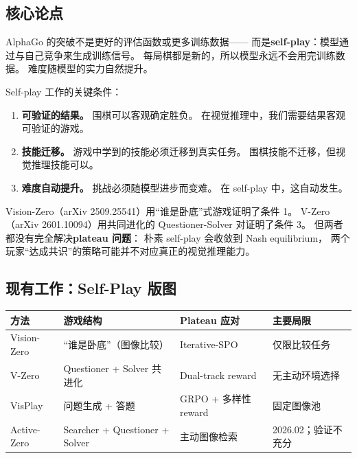 \documentclass[12pt,a4paper]{article}
\begin{document}
\subsection{核心论点}

\begin{insightbox}
AlphaGo 的突破不是更好的评估函数或更多训练数据——
而是\textbf{self-play}：模型通过与自己竞争来生成训练信号。
每局棋都是新的，所以模型永远不会用完训练数据。
难度随模型的实力自然提升。

Self-play 工作的关键条件：
\begin{enumerate}[leftmargin=2em]
  \item \textbf{可验证的结果。}
    围棋可以客观确定胜负。
    在视觉推理中，我们需要结果客观可验证的游戏。
  \item \textbf{技能迁移。}
    游戏中学到的技能必须迁移到真实任务。
    围棋技能不迁移，但视觉推理技能可以。
  \item \textbf{难度自动提升。}
    挑战必须随模型进步而变难。
    在 self-play 中，这自动发生。
\end{enumerate}

Vision-Zero（arXiv 2509.25541）用``谁是卧底''式游戏证明了条件 1。
V-Zero（arXiv 2601.10094）用共同进化的 Questioner-Solver 对证明了条件 3。
但两者都没有完全解决\textbf{plateau 问题}：
朴素 self-play 会收敛到 Nash equilibrium，
两个玩家``达成共识''的策略可能并不对应真正的视觉推理能力。
\end{insightbox}

\subsection{现有工作：Self-Play 版图}

\begin{table}[h]
\centering
\small
\begin{tabular}{p{2.5cm}p{3cm}p{2.5cm}p{3cm}}
\toprule
\textbf{方法} & \textbf{游戏结构} & \textbf{Plateau 应对} & \textbf{主要局限} \\
\midrule
Vision-Zero & ``谁是卧底''（图像比较） & Iterative-SPO & 仅限比较任务 \\
V-Zero & Questioner + Solver 共进化 & Dual-track reward & 无主动环境选择 \\
VisPlay & 问题生成 + 答题 & GRPO + 多样性 reward & 固定图像池 \\
Active-Zero & Searcher + Questioner + Solver & 主动图像检索 & 2026.02；验证不充分 \\
\bottomrule
\end{tabular}
\end{table}
\end{document}
